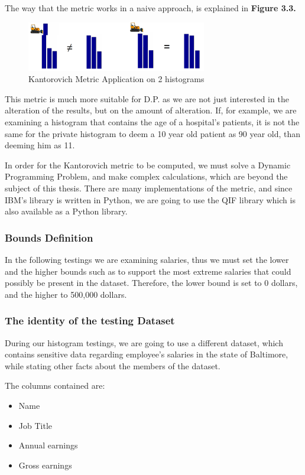 The way that the metric works in a naive approach, is explained in \textbf{Figure 3.3.}

\begin{figure}[!htb]\centering
    \includegraphics[width=0.7\textwidth]{images/emd.png}
    \caption{Kantorovich Metric Application on 2 histograms}
\end{figure}

This metric is much more suitable for D.P. as we are not just interested in the alteration of the results, but on the amount of alteration. If, for example, we are examining a histogram that contains the age of a hospital's patients, it is not the same for the private histogram to deem a 10 year old patient as 90 year old, than deeming him as 11. 

In order for the Kantorovich metric to be computed, we must solve a Dynamic Programming Problem, and make complex calculations, which are beyond the subject of this thesis. There are many implementations of the metric, and since IBM's library is written in Python, we are going to use the QIF library %
which is also available as a Python library. 


\subsubsection{Bounds Definition}

In the following testings we are examining salaries, thus we must set the lower and the higher bounds such as to support the most extreme salaries that could possibly be present in the dataset. Therefore, the lower bound is set to 0 dollars, and the higher to 500,000 dollars.

\subsubsection{The identity of the testing Dataset}

During our histogram testings, we are going to use a different dataset, which contains  sensitive data regarding employee's salaries in the state of Baltimore, while stating other facts about the members of the dataset. 

The columns contained are: 
\begin{itemize}
    \item Name
    \item Job Title
    \item Annual earnings
    \item Gross earnings
\end{itemize}


